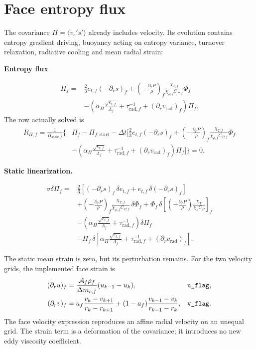 \documentclass[11pt]{article}
\newcommand{\code}[1]{\texttt{\detokenize{#1}}}
\newcommand{\area}{\mathcal A}
\newcommand{\dmf}{\Delta m_{c,f}}
\newcommand{\negds}{(-\partial_r s)}
\newcommand{\buo}{\left(-\frac{\partial_r P}{\rho}\right)}
\newenvironment{solved}[2]{%
 \begin{tcolorbox}[colback=#1!3!white,colframe=#1,boxrule=0.4pt,
 leftrule=2pt,arc=0pt,left=7pt,right=7pt,top=5pt,bottom=5pt,
 before skip=7pt,after skip=7pt]
 \noindent\textcolor{#1}{\textbf{#2}}\par
 \setlength{\abovedisplayskip}{5pt}\setlength{\belowdisplayskip}{5pt}
}{\end{tcolorbox}}
\newcommand{\linear}{\par\smallskip\noindent\textcolor{Dynamic}{\textbf{Static linearization.}}\par}
\numberwithin{equation}{section}
\begin{document}
\section{Face entropy flux}
The covariance $\Pi=\langle v_r's'\rangle$ already includes velocity.
Its evolution contains entropy gradient driving, buoyancy acting on entropy
variance, turnover relaxation, radiative cooling and mean radial strain:
\begin{solved}{Dynamic}{Entropy flux}
\begin{equation}
\begin{aligned}
 \dot\Pi_f={}&\frac23 e_{t,f}\negds_f
 +\buo_f\frac{\chi_{T,f}}{\chi_{\rho,f}C_{P,f}}\Phi_f\\
 &-\left(\alpha_\Pi\frac{\sqrt{e_{t,f}}}{\Lambda_f}
       +\tau_{\mathrm{rad},f}^{-1}
       +(\partial_r v_{\mathrm{rad}})_f\right)\Pi_f .
\end{aligned}
\label{eq:Pi}
\end{equation}
The row actually solved is
\begin{equation}
\begin{aligned}
 R_{\Pi,f}=\frac{1}{\Pi_{\mathrm{scale},f}}\bigg\{
 &\Pi_f-\Pi_{f,\mathrm{start}}
 -\Delta t\bigg[\frac23e_{t,f}\negds_f
 +\buo_f\frac{\chi_{T,f}}{\chi_{\rho,f}C_{P,f}}\Phi_f\\
 &-\left(\alpha_\Pi\frac{\sqrt{e_{t,f}}}{\Lambda_f}
       +\tau_{\mathrm{rad},f}^{-1}
       +(\partial_r v_{\mathrm{rad}})_f\right)\Pi_f\bigg]\bigg\}=0 .
\end{aligned}
\end{equation}
\linear
\begin{equation}
\begin{aligned}
 \sigma\delta\Pi_f={}&
 \frac23\left[\negds_f\,\delta e_{t,f}
                      +e_{t,f}\,\delta\negds_f\right]\\
 &+\buo_f\frac{\chi_{T,f}}{\chi_{\rho,f}C_{P,f}}\,\delta\Phi_f
 +\Phi_f\,\delta\left[
 \buo\frac{\chi_T}{\chi_\rho C_P}\right]_f\\
 &-\left(\alpha_\Pi\frac{\sqrt{e_{t,f}}}{\Lambda_f}
                 +\tau_{\mathrm{rad},f}^{-1}\right)\delta\Pi_f\\
 &-\Pi_f\,\delta\left[
 \alpha_\Pi\frac{\sqrt{e_{t,f}}}{\Lambda_f}
 +\tau_{\mathrm{rad},f}^{-1}
 +(\partial_r v_{\mathrm{rad}})_f\right].
\end{aligned}
\end{equation}
\end{solved}
The static mean strain is zero, but its perturbation remains.
For the two velocity grids, the implemented face strain is
\begin{align}
 (\partial_r u)_f&=
       \frac{\area_f\rho_f}{\dmf}(u_{k-1}-u_k),
       &&\code{u_flag},\\
 (\partial_r v)_f&=
 a_f\frac{v_k-v_{k+1}}{r_k-r_{k+1}}
 +(1-a_f)\frac{v_{k-1}-v_k}{r_{k-1}-r_k},
       &&\code{v_flag}.
\end{align}
The face velocity expression reproduces an affine radial velocity on an
unequal grid. The strain term is a deformation of the covariance;
it introduces no new eddy viscosity coefficient.
\end{document}
